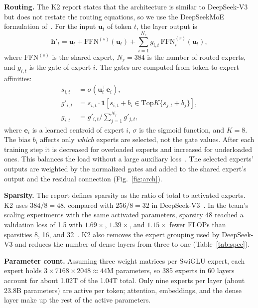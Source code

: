 \documentclass[conference]{IEEEtran}
\begin{document}
\textbf{Routing.} The K2 report states that the architecture is similar to DeepSeek-V3 but does not restate the routing equations, so we use the DeepSeekMoE formulation of~\cite{deepseekv3}. For the input $\mathbf{u}_t$ of token $t$, the layer output is
\begin{equation}
\mathbf{h}'_t=\mathbf{u}_t+\mathrm{FFN}^{(s)}(\mathbf{u}_t)+\sum_{i=1}^{N_r} g_{i,t}\,\mathrm{FFN}^{(r)}_i(\mathbf{u}_t),
\end{equation}
where $\mathrm{FFN}^{(s)}$ is the shared expert, $N_r=384$ is the number of routed experts, and $g_{i,t}$ is the gate of expert $i$. The gates are computed from token-to-expert affinities:
\begin{align}
s_{i,t}&=\sigma\!\left(\mathbf{u}_t^{\top}\mathbf{e}_i\right),\\
g'_{i,t}&=s_{i,t}\cdot\mathbf{1}\!\left[s_{i,t}+b_i\in\mathrm{Top}K\{s_{j,t}+b_j\}\right],\\
g_{i,t}&=g'_{i,t}\Big/\textstyle\sum_{j=1}^{N_r} g'_{j,t},
\end{align}
where $\mathbf{e}_i$ is a learned centroid of expert $i$, $\sigma$ is the sigmoid function, and $K=8$. The bias $b_i$ affects only \emph{which} experts are selected, not the gate values. After each training step it is decreased for overloaded experts and increased for underloaded ones. This balances the load without a large auxiliary loss~\cite{deepseekv3}. The selected experts' outputs are weighted by the normalized gates and added to the shared expert's output and the residual connection (Fig.~\ref{fig:arch}).

\textbf{Sparsity.} The report defines sparsity as the ratio of total to activated experts. K2 uses $384/8=48$, compared with $256/8=32$ in DeepSeek-V3~\cite{kimik2}. In the team's scaling experiments with the same activated parameters, sparsity 48 reached a validation loss of 1.5 with $1.69\times$, $1.39\times$, and $1.15\times$ fewer FLOPs than sparsities 8, 16, and 32~\cite{kimik2}. K2 also removes the expert grouping used by DeepSeek-V3 and reduces the number of dense layers from three to one (Table~\ref{tab:spec}).

\textbf{Parameter count.} Assuming three weight matrices per SwiGLU expert, each expert holds $3\times7168\times2048\approx44$M parameters, so 385 experts in 60 layers account for about 1.02T of the 1.04T total. Only nine experts per layer (about 23.8B parameters) are active per token; attention, embeddings, and the dense layer make up the rest of the active parameters.
\end{document}

